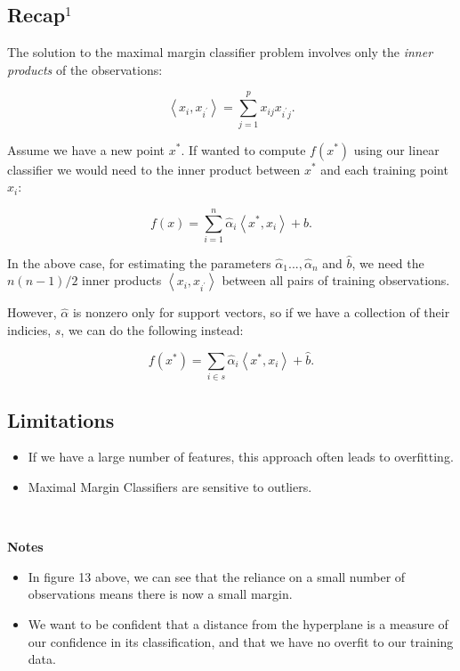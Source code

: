 \documentclass[11pt]{article}
\providecommand{\tightlist}{%
      \setlength{\itemsep}{0pt}\setlength{\parskip}{0pt}}
\begin{document}
    \hypertarget{recap1}{%
\subsection{\texorpdfstring{Recap\(^1\)}{Recap\^{}1}}\label{recap1}}

The solution to the maximal margin classifier problem involves only the
\emph{inner products} of the observations:

\[
\left<x_i,x_{i^{\prime}}\right> = \sum^p_{j=1}x_{ij}x_{i^{\prime}j}.
\]

Assume we have a new point \(x^*\). If wanted to compute \(f(x^*)\)
using our linear classifier we would need to the inner product between
\(x^*\) and each training point \(x_i\):

\[f(x) = \sum^n_{i=1}\hat\alpha_i\left<x^*,x_i\right>+ \hat b.\]

In the above case, for estimating the parameters
\(\hat\alpha_1...,\hat\alpha_n\) and \(\hat b\), we need the
\(n(n-1)/2\) inner products \(\left<x_i,x_{i^\prime}\right>\) between
all pairs of training observations.

However, \(\hat\alpha\) is nonzero only for support vectors, so if we
have a collection of their indicies, \(s\), we can do the following
instead:

\[
f(x^*) = \sum_{i\in s}\hat\alpha_i \left<x^*,x_i\right> + \hat b.
\]

    \hypertarget{limitations}{%
\subsection{Limitations}\label{limitations}}

\begin{itemize}
\tightlist
\item
  If we have a large number of features, this approach often leads to
  overfitting.
\item
  Maximal Margin Classifiers are sensitive to outliers.
\end{itemize}

    \begin{center}
    \end{center}
    { \hspace*{\fill} \\}
    
    \textbf{Notes}

\begin{itemize}
\tightlist
\item
  In figure 13 above, we can see that the reliance on a small number of
  observations means there is now a small margin.
\item
  We want to be confident that a distance from the hyperplane is a
  measure of our confidence in its classification, and that we have no
  overfit to our training data.
\end{itemize}
\end{document}
